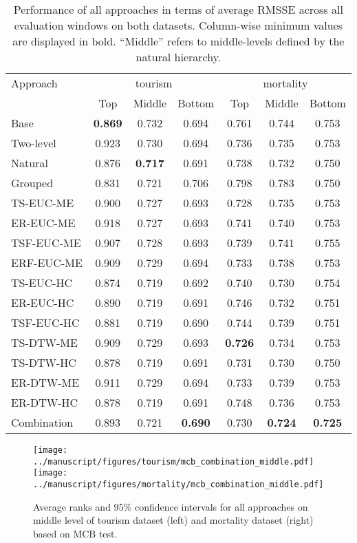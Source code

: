 \documentclass[12pt]{article}
\begin{document}
\begin{table}[h!]
\renewcommand\thetable{S.1}
    \centering
\caption{\label{tab:P3_rmsse}Performance of all approaches in terms of average RMSSE across all evaluation windows on both datasets. Column-wise minimum values are displayed in bold. ``Middle'' refers to middle-levels defined by the natural hierarchy. }
\vspace{0.1in}
\begin{tabular}{lcccccc}
\toprule
 Approach & \multicolumn{3}{c}{tourism} & \multicolumn{3}{c}{mortality} \\ 
 \cmidrule(lr){2-4} \cmidrule(lr){5-7}
 & Top & Middle & Bottom & Top & Middle & Bottom \\ \midrule
 Base & \textbf{0.869} & 0.732 & 0.694 & 0.761 & 0.744 & 0.753 \\
Two-level & 0.923 & 0.730 & 0.694 & 0.736 & 0.735 & 0.753 \\
Natural & 0.876 & \textbf{0.717} & 0.691 & 0.738 & 0.732 & 0.750 \\
Grouped & 0.831  & 0.721 & 0.706 & 0.798 & 0.783 & 0.750 \\
TS-EUC-ME & 0.900 & 0.727 & 0.693 & 0.728 & 0.735 & 0.753 \\
ER-EUC-ME & 0.918 & 0.727 & 0.693 & 0.741 & 0.740 & 0.753 \\
TSF-EUC-ME & 0.907 & 0.728 & 0.693 & 0.739 & 0.741 & 0.755 \\
ERF-EUC-ME & 0.909 & 0.729 & 0.694 & 0.733 & 0.738 & 0.753 \\
TS-EUC-HC & 0.874 & 0.719 & 0.692 & 0.740 & 0.730 & 0.754 \\
ER-EUC-HC & 0.890 & 0.719 & 0.691 & 0.746 & 0.732 & 0.751 \\
TSF-EUC-HC & 0.881 & 0.719 & 0.690 & 0.744 & 0.739 & 0.751 \\
TS-DTW-ME & 0.909 & 0.729 & 0.693 & \textbf{0.726} & 0.734 & 0.753 \\
TS-DTW-HC & 0.878 & 0.719 & 0.691 & 0.731 & 0.730 & 0.750 \\
ER-DTW-ME & 0.911 & 0.729 & 0.694 & 0.733 & 0.739 & 0.753 \\
ER-DTW-HC & 0.878 & 0.719 & 0.691 & 0.748 & 0.736 & 0.753 \\ 
Combination & 0.893 & 0.721 & \textbf{0.690} & 0.730 & \textbf{0.724} & \textbf{0.725} \\
\bottomrule\end{tabular}

\end{table}

\begin{figure}[h!]
\renewcommand\thefigure{S.1}
    \centering
    \texttt{[image: ../manuscript/figures/tourism/mcb\_combination\_middle.pdf]}
    \texttt{[image: ../manuscript/figures/mortality/mcb\_combination\_middle.pdf]}
    \caption{\label{fig:mcb_middle}Average ranks and 95\% confidence intervals for all approaches on middle level of tourism dataset (left) and mortality dataset (right) based on MCB test.}
\end{figure}
\end{document}
